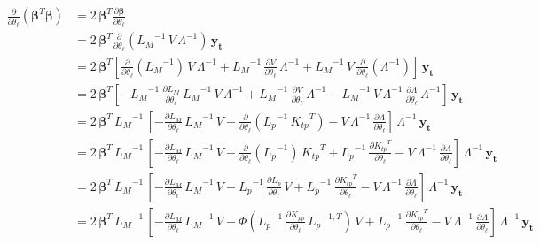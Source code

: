 \documentclass[11pt,a4paper]{article}
\numberwithin{equation}{section}
\begin{document}
\begin{align}
\frac{\partial }{\partial \theta_\ell}\left({\bm \beta}^T{\bm \beta}\right)
  &= 2\,{\bm \beta}^T\frac{\partial {\bm \beta}}{\partial \theta_\ell} \\
  &= 2\,{\bm \beta}^T\frac{\partial}{\partial \theta_\ell}\left({L_M}^{-1}\,V\,\Lambda^{-1}\right)\,\mathbf{y_t} \\
  &= 2\,{\bm \beta}^T\left[
    \frac{\partial}{\partial \theta_\ell}\left({L_M}^{-1}\right)\,V\,\Lambda^{-1} +
    {L_M}^{-1}\,\frac{\partial V}{\partial \theta_\ell}\,\Lambda^{-1} +
    {L_M}^{-1}\,V\,\frac{\partial}{\partial \theta_\ell}\left(\Lambda^{-1}\right)
  \right]\,\mathbf{y_t} \\
  &= 2\,{\bm \beta}^T\left[
    -{L_M}^{-1}\,\frac{\partial {L_M}}{\partial \theta_\ell}\,{L_M}^{-1}\,V\,\Lambda^{-1} +
    {L_M}^{-1}\,\frac{\partial V}{\partial \theta_\ell}\,\Lambda^{-1} -
    {L_M}^{-1}\,V\,\Lambda^{-1}\,\frac{\partial\Lambda}{\partial \theta_\ell}\,\Lambda^{-1}
  \right]\,\mathbf{y_t} \\
  &= 2\,{\bm \beta}^T\,{L_M}^{-1}\,\left[
    -\frac{\partial {L_M}}{\partial \theta_\ell}\,{L_M}^{-1}\,V +
    \frac{\partial}{\partial \theta_\ell}\left({L_p}^{-1}\,{K_{tp}}^T\right) -
    V\,\Lambda^{-1}\,\frac{\partial\Lambda}{\partial \theta_\ell}
  \right]\,\Lambda^{-1}\,\mathbf{y_t} \\
  &= 2\,{\bm \beta}^T\,{L_M}^{-1}\,\left[
    -\frac{\partial {L_M}}{\partial \theta_\ell}\,{L_M}^{-1}\,V +
    \frac{\partial}{\partial \theta_\ell}\left({L_p}^{-1}\right)\,{K_{tp}}^T +
    {L_p}^{-1}\,\frac{\partial {K_{tp}}^T}{\partial \theta_\ell} -
    V\,\Lambda^{-1}\,\frac{\partial\Lambda}{\partial \theta_\ell}
  \right]\,\Lambda^{-1}\,\mathbf{y_t} \\
  &= 2\,{\bm \beta}^T\,{L_M}^{-1}\,\left[
    -\frac{\partial {L_M}}{\partial \theta_\ell}\,{L_M}^{-1}\,V -
    {L_p}^{-1}\,\frac{\partial {L_p}}{\partial \theta_\ell}\,V +
    {L_p}^{-1}\,\frac{\partial {K_{tp}}^T}{\partial \theta_\ell} -
    V\,\Lambda^{-1}\,\frac{\partial\Lambda}{\partial \theta_\ell}
  \right]\,\Lambda^{-1}\,\mathbf{y_t} \\
  &= 2\,{\bm \beta}^T\,{L_M}^{-1}\,\left[
    -\frac{\partial {L_M}}{\partial \theta_\ell}\,{L_M}^{-1}\,V -
    \Phi\left({L_p}^{-1}\,\frac{\partial {K_{pp}}}{\partial \theta_\ell}\,{L_p}^{-1,T}\right)\,V +
    {L_p}^{-1}\,\frac{\partial {K_{tp}}^T}{\partial \theta_\ell} -
    V\,\Lambda^{-1}\,\frac{\partial\Lambda}{\partial \theta_\ell}
  \right]\,\Lambda^{-1}\,\mathbf{y_t}
\end{align}
\end{document}

